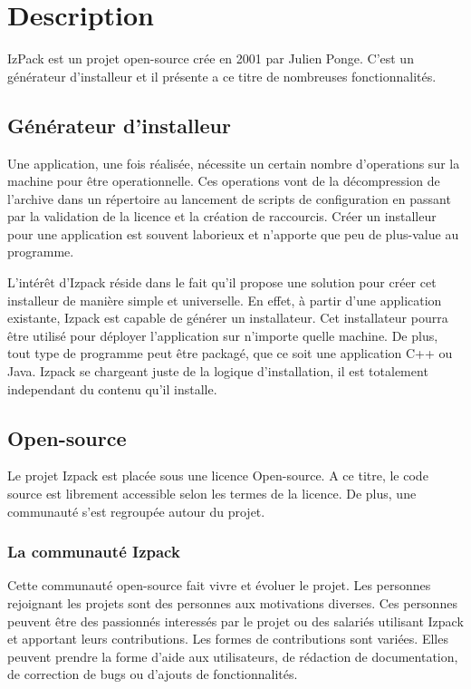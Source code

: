 \section{Description}
IzPack est un projet open-source crée en 2001 par Julien Ponge. C'est un générateur d'installeur et il présente a ce titre de nombreuses fonctionnalités.
\subsection{Générateur d'installeur}
Une application, une fois réalisée, nécessite un certain nombre d'operations sur la machine pour être operationnelle.
Ces operations vont de la décompression de l'archive dans un répertoire au lancement de scripts de configuration en passant par la validation de la licence et la création de raccourcis.
Créer un installeur pour une application est souvent laborieux et n'apporte que peu de plus-value au programme. 

L'intérêt d'Izpack réside dans le fait qu'il propose une solution pour créer cet installeur de manière simple et universelle.
En effet, à partir d'une application existante, Izpack est capable de générer un installateur. Cet installateur pourra être utilisé pour déployer l'application sur n'importe quelle machine.
De plus, tout type de programme peut être packagé, que ce soit une application C++ ou Java. Izpack se chargeant juste de la logique d'installation, il est totalement independant du contenu qu'il installe.
\subsection{Open-source}
Le projet Izpack est placée sous une licence Open-source. A ce titre, le code source est librement accessible selon les termes de la licence. De plus, une communauté s'est regroupée autour du projet.
\subsubsection{La communauté Izpack}
Cette communauté open-source fait vivre et évoluer le projet. Les personnes rejoignant les projets sont des personnes aux motivations diverses.
Ces personnes peuvent être des passionnés interessés par le projet ou des salariés utilisant Izpack et apportant leurs contributions.
Les formes de contributions sont variées.
Elles peuvent prendre la forme d'aide aux utilisateurs, de rédaction de documentation, de correction de bugs ou d'ajouts de fonctionnalités.
